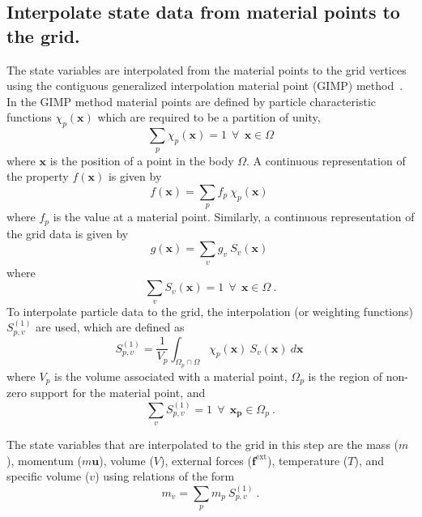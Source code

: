     \subsection{ Interpolate state data from material points to 
      the grid.}
      The state variables are interpolated from the material points to
      the grid vertices using the contiguous generalized interpolation
      material point (GIMP) method~\cite{Bard2000a}.  In the GIMP method
      material points are defined by particle characteristic functions
      $\chi_p(\mathbf{x})$ which are required to be a partition of unity,
      \begin{equation}
        \sum_p \chi_p (\mathbf{x}) = 1~~\forall~~\mathbf{x} \in \Omega
      \end{equation}
      where $\mathbf{x}$ is the position of a point in the body $\Omega$. 
      A continuous representation of the property $f(\mathbf{x})$ 
      is given by
      \begin{equation}      
        f(\mathbf{x}) = \sum_p f_p~\chi_p(\mathbf{x})~
      \end{equation}      
      where $f_p$ is the value at a material point.
      Similarly, a continuous representation of the grid data is given by
      \begin{equation}      
        g(\mathbf{x}) = \sum_v g_v~S_v(\mathbf{x})~
      \end{equation}      
      where
      \begin{equation} 
        \sum_v S_v(\mathbf{x}) = 1~~\forall~~\mathbf{x} \in \Omega~.
      \end{equation} 
      To interpolate particle data to the grid, the interpolation (or 
      weighting functions) $S^{(1)}_{p,v}$ are used, which are defined as
      \begin{equation}
        S^{(1)}_{p,v} = \frac{1}{V_p}\int_{\Omega_p\cap\Omega}
                            \chi_p(\mathbf{x})~S_v(\mathbf{x})~d{\mathbf{x}}~
      \end{equation}
      where $V_p$ is the volume associated with a material point, $\Omega_p$
      is the region of non-zero support for the material point, and
      \begin{equation} 
        \sum_v S^{(1)}_{p,v} = 1~~\forall~~\mathbf{x_p} \in \Omega_p~.
      \end{equation} 

      The state variables that are interpolated to the grid in this step
      are the mass ($m$), momentum ($m\mathbf{u}$), volume ($V$),
      external forces ($\mathbf{f}^{\text{ext}}$), temperature ($T$),
      and specific volume ($v$) using relations of the form
      \begin{equation}
        m_v = \sum_p m_p~S^{(1)}_{p,v}~.
      \end{equation}

